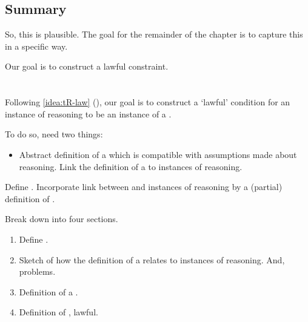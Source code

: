 \subsection{Summary}

\begin{note}
  So, this is plausible.
  The goal for the remainder of the chapter is to capture this in a specific way.

  Our goal is to construct a lawful constraint.
\end{note}

\section{}
\label{cha:typical:sec:tR}


\begin{note}
  Following \autoref{idea:tR-law} (), our goal is to construct a `lawful' condition for an instance of reasoning to be an instance of a \torN{}.

  To do so, need two things:

  \begin{itemize}
  \item
    Abstract definition of a \tor{} which is compatible with assumptions made about reasoning.
    Link the definition of a \tor{} to instances of reasoning.
  \end{itemize}

  Define \tor{}.
  Incorporate link between \torN{} and instances of reasoning by a (partial) definition of \tRN{}.
\end{note}

\begin{note}
  Break down into four sections.

  \begin{enumerate}[label=]
  \item

    Define \tor{}.
  \item

    Sketch of how the definition of a \tor{} relates to instances of reasoning.
    And, problems.
  \item

    Definition of a \rotorN{}.
  \item

    Definition of \tR{}, lawful.
  \end{enumerate}
\end{note}


